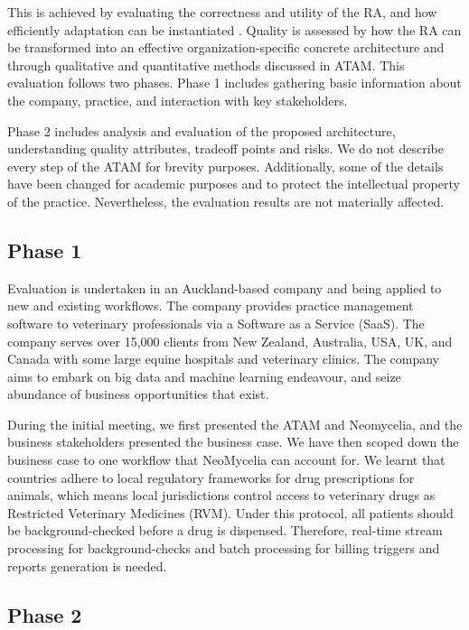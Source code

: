 \documentclass[conference]{IEEEtran}
\begin{document}
This is achieved by evaluating the correctness and utility of the RA, and how efficiently adaptation can be instantiated \cite{GALSTER}. Quality is assessed by how the RA can be transformed into an effective organization-specific concrete architecture and through qualitative and quantitative methods discussed in ATAM. This evaluation follows two phases. Phase 1 includes gathering basic information about the company, practice, and interaction with key stakeholders.

Phase 2 includes analysis and evaluation of the proposed architecture, understanding quality attributes, tradeoff points and risks. We do not describe every step of the ATAM for brevity purposes. Additionally, some of the details have been changed for academic purposes and to protect the intellectual property of the practice. Nevertheless, the evaluation results are not materially affected.

\subsection{Phase 1}

Evaluation is undertaken in an Auckland-based company and being applied to new and existing workflows. The company provides practice management software to veterinary professionals via a Software as a Service (SaaS). The company serves over 15,000 clients from New Zealand, Australia, USA, UK, and Canada with some large equine hospitals and veterinary clinics. The company aims to embark on big data and machine learning endeavour, and seize abundance of business opportunities that exist.

During the initial meeting, we first presented the ATAM and Neomycelia, and the business stakeholders presented the business case. We have then scoped down the business case to one workflow that NeoMycelia can account for. We learnt that countries adhere to local regulatory frameworks for drug prescriptions for animals, which means local jurisdictions control access to veterinary drugs as Restricted Veterinary Medicines (RVM). Under this protocol, all patients should be background-checked before a drug is dispensed. Therefore, real-time stream processing for background-checks and batch processing for billing triggers and reports generation is needed.

\subsection{Phase 2}
\end{document}
